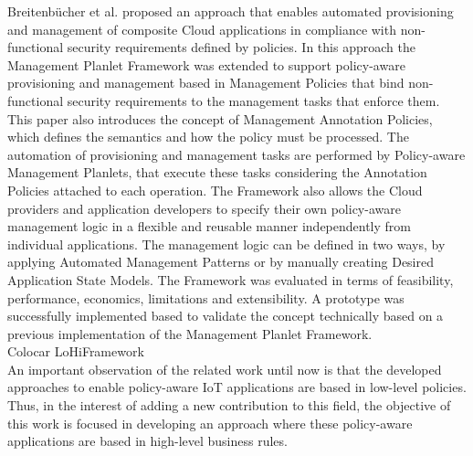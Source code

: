 Breitenb\"{u}cher et al. \cite{breitenbucher2014policy} proposed an approach that enables automated provisioning
and management of composite Cloud applications in compliance with non-functional security requirements defined by
policies. In this approach the Management Planlet Framework \cite{breitenbucher2013policy} was extended to support
policy-aware provisioning and management based in Management Policies that bind non-functional security requirements
to the management tasks that enforce them. This paper also introduces the concept of Management Annotation
Policies, which defines the semantics and how the policy must be processed. The automation of provisioning and
management tasks are performed by Policy-aware Management Planlets, that execute these tasks considering the
Annotation Policies attached to each operation. The Framework also allows the Cloud providers and application
developers to specify their own policy-aware management logic in a flexible and reusable manner independently
from individual applications. The management logic can be defined in two ways, by applying Automated Management
Patterns or by manually creating Desired Application State Models. The Framework was evaluated in terms of
feasibility, performance, economics, limitations and extensibility. A prototype was successfully implemented based
to validate the concept technically based on a previous implementation of the Management Planlet Framework.\\

Colocar LoHiFramework\\

An important observation of the related work until now is that the developed approaches to enable policy-aware
IoT applications are based in low-level policies. Thus, in the interest of adding a new contribution to this field,
the objective of this work is focused in developing an approach where these policy-aware applications are based in
high-level business rules.
